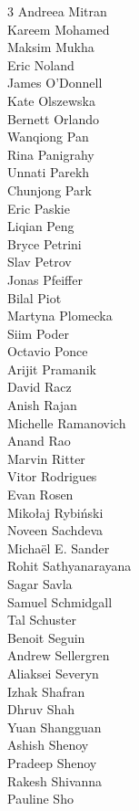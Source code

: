 \begin{multicols}{3}
Andreea Mitran \\ 
Kareem Mohamed \\ 
Maksim Mukha \\ 
Eric Noland \\ 
James O'Donnell \\ 
Kate Olszewska \\ 
Bernett Orlando \\ 
Wanqiong Pan \\ 
Rina Panigrahy \\ 
Unnati Parekh \\ 
Chunjong Park \\ 
Eric Paskie \\ 
Liqian Peng \\ 
Bryce Petrini \\ 
Slav Petrov \\ 
Jonas Pfeiffer \\ 
Bilal Piot \\ 
Martyna Plomecka \\ 
Siim Poder \\ 
Octavio Ponce \\ 
Arijit Pramanik \\ 
David Racz \\ 
Anish Rajan \\ 
Michelle Ramanovich \\ 
Anand Rao \\ 
Marvin Ritter \\ 
Vitor Rodrigues \\ 
Evan Rosen \\ 
Mikołaj Rybiński \\ 
Noveen Sachdeva \\ 
Michaël E. Sander \\  
Rohit Sathyanarayana \\ 
Sagar Savla \\ 
Samuel Schmidgall \\ 
Tal Schuster \\ 
Benoit Seguin \\ 
Andrew Sellergren \\ 
Aliaksei Severyn \\ 
Izhak Shafran \\ 
Dhruv Shah \\ 
Yuan Shangguan \\ 
Ashish Shenoy \\ 
Pradeep Shenoy \\ 
Rakesh Shivanna \\ 
Pauline Sho \\ 

\end{multicols}
